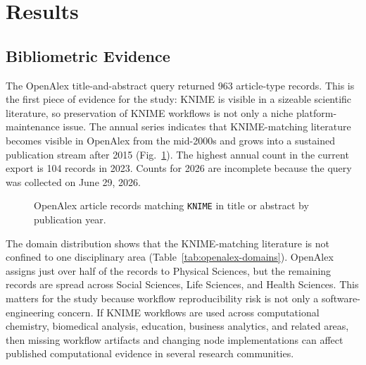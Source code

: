 \documentclass[runningheads]{llncs}
\begin{document}
\section{Results}

\subsection{Bibliometric Evidence}

The OpenAlex title-and-abstract query returned 963 article-type records. This
is the first piece of evidence for the study: KNIME is visible in a sizeable
scientific literature, so preservation of KNIME workflows is not only a niche
platform-maintenance issue. The annual series indicates that KNIME-matching
literature becomes visible in OpenAlex from the mid-2000s and grows into a
sustained publication stream after 2015 (Fig.~\ref{fig:openalex-by-year}). The
highest annual count in the current export is 104 records in 2023. Counts for
2026 are incomplete because the query was collected on June 29, 2026.

\begin{figure}
\centering
{}
\caption{OpenAlex article records matching \texttt{KNIME} in title or
abstract by publication year.}
\label{fig:openalex-by-year}
\end{figure}

The domain distribution shows that the KNIME-matching literature is not
confined to one disciplinary area (Table~\ref{tab:openalex-domains}). OpenAlex
assigns just over half of the records to Physical Sciences, but the remaining
records are spread across Social Sciences, Life Sciences, and Health Sciences.
This matters for the study because workflow reproducibility risk is not only a
software-engineering concern. If KNIME workflows are used across computational
chemistry, biomedical analysis, education, business analytics, and related
areas, then missing workflow artifacts and changing node implementations can
affect published computational evidence in several research communities.
\end{document}
